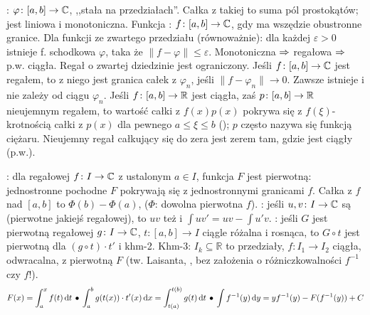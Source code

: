 :  $\varphi \colon [a,b] \to \mathbb{C}$, ,,stała  na przedziałach''.
Całka z takiej  to suma pól prostokątów; jest liniowa i monotoniczna.
Funkcja : $f \colon [a,b] \to \mathbb{C}$, gdy ma wszędzie obustronne granice.
Dla funkcji ze zwartego przedziału (równoważnie): dla każdej $\varepsilon > 0$ istnieje f. schodkowa $\varphi$, taka że $\|f - \varphi\| \le \varepsilon$.
Monotoniczna $\Rightarrow$ regałowa $\Rightarrow$ p.w. ciągła.
Regał o zwartej dziedzinie jest ograniczony.
Jeśli $f \colon [a,b] \to \mathbb{C}$  jest regałem, to  z niego jest granica całek z $\varphi_n$, jeśli $\|f - \varphi_n\| \to 0$.
Zawsze istnieje i nie zależy od ciągu $\varphi_n$.
Jeśli $f \colon [a,b] \to \mathbb{R}$ jest ciągła, zaś $p \colon [a,b] \to \mathbb{R}$ nieujemnym regałem, to wartość całki z $f(x) p (x)$ pokrywa się z $f(\xi)$-krotnością całki z $p(x)$ dla pewnego $a \le \xi \le b$ (); $p$ często nazywa się funkcją ciężaru.
Nieujemny regał całkujący się do zera jest zerem tam, gdzie jest ciągły (p.w.).

:  dla regałowej $f \colon I \to \mathbb{C}$ z ustalonym $a \in I$, funkcja $F$ jest pierwotną: jednostronne pochodne $F$ pokrywają się z jednostronnymi granicami $f$.
Całka z $f$ nad $[a,b]$ to $\Phi(b) - \Phi(a)$, ($\Phi$: dowolna pierwotna $f$).
: jeśli $u,v \colon I \to \mathbb{C}$ są  (pierwotne jakiejś regałowej), to $uv$ też i $\int uv' = uv - \int u'v$.
: jeśli $G$ jest pierwotną regałowej $g \colon I \to \mathbb{C}$, $t \colon [a,b]\to I$ ciągle różalna i rosnąca, to $G \circ t$ jest pierwotną dla $(g \circ t) \cdot t'$ i khm-2.
Khm-3: $I_k \subseteq \mathbb R$ to przedziały, $f \colon I_1 \to I_2$ ciągła, odwracalna, z pierwotną $F$ (tw. Laisanta, , bez założenia o różniczkowalności $f^{-1}$ czy $f$!).
\[
	F(x) = \int_a^x f(t)\,\textrm{d}t \, \bullet \,
	\int_a^b g(t(x)) \cdot t'(x) \,\textrm{d}x = \int_{t(a)}^{t(b)} g(t) \,\textrm{d}t \, \bullet \,
	\int f^{-1}(y) \,\textrm{d}y = y f^{-1}(y) - F(f^{-1}(y)) + C
\]

